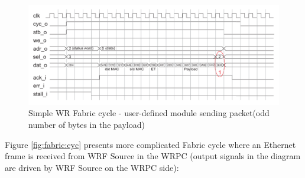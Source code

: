 \begin{figure}
  \begin{center}
    \includegraphics[width=\textwidth]{fig/basic_wrf_cycle_sel.pdf}
    \caption{Simple WR Fabric cycle - user-defined module sending packet(odd
    number of bytes in the payload)}
    \label{fig:fabric:sel}
  \end{center}
\end{figure}

Figure \ref{fig:fabric:cyc} presents more complicated Fabric cycle where an
Ethernet frame is received from WRF Source in the WRPC (output signals in the
diagram are driven by WRF Source on the WRPC side): 

